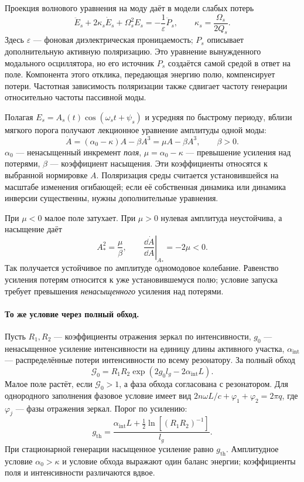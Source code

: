 Проекция волнового уравнения на моду даёт в модели слабых потерь
\begin{equation}
 \ddot E_s+2\kappa_s\dot E_s+\Omega_s^2 E_s
 =-\frac1{\varepsilon}\ddot P_s,\qquad
 \kappa_s=\frac{\Omega_s}{2Q_s}.
\end{equation}
Здесь $\varepsilon$ --- фоновая диэлектрическая проницаемость; $P_s$ описывает дополнительную активную поляризацию. Это уравнение вынужденного модального осциллятора, но его источник $P_s$ создаётся самой средой в ответ на поле. Компонента этого отклика, передающая энергию полю, компенсирует потери. Частотная зависимость поляризации также сдвигает частоту генерации относительно частоты пассивной моды.

Полагая $E_s=A_s(t)\cos(\omega_s t+\psi_s)$ и усредняя по быстрому периоду, вблизи мягкого порога получают лекционное уравнение амплитуды одной моды:
\begin{equation}\label{eq:laserRate}
 \dot A=(\alpha_0-\kappa)A-\beta A^3
       =\mu A-\beta A^3,\qquad \beta>0.
\end{equation}
$\alpha_0$ --- ненасыщенный инкремент \emph{поля}, $\mu=\alpha_0-\kappa$ --- превышение усиления над потерями, $\beta$ --- коэффициент насыщения. Эти коэффициенты относятся к выбранной нормировке $A$. Поляризация среды считается установившейся на масштабе изменения огибающей; если её собственная динамика или динамика инверсии существенны, нужны дополнительные уравнения.

При $\mu<0$ малое поле затухает. При $\mu>0$ нулевая амплитуда неустойчива, а насыщение даёт
\begin{equation}
 A_*^2=\frac{\mu}{\beta},\qquad
 \left.\frac{\dd\dot A}{\dd A}\right|_{A_*}=-2\mu<0.
\end{equation}
Так получается устойчивое по амплитуде одномодовое колебание. Равенство усиления потерям относится к уже установившемуся полю; условие запуска требует превышения \emph{ненасыщенного} усиления над потерями.

\paragraph{То же условие через полный обход.}
Пусть $R_1,R_2$ --- коэффициенты отражения зеркал по интенсивности, $g_0$ --- ненасыщенное усиление интенсивности на единицу длины активного участка, $\alpha_{\mathrm{int}}$ --- распределённые потери интенсивности по всему резонатору. За полный обход
\begin{equation}
 \mathcal G_0=R_1R_2\exp(2g_0l_g-2\alpha_{\mathrm{int}}L).
\end{equation}
Малое поле растёт, если $\mathcal G_0>1$, а фаза обхода согласована с резонатором. Для однородного заполнения фазовое условие имеет вид $2n\omega L/c+\varphi_1+\varphi_2=2\pi q$, где $\varphi_j$ --- фазы отражения зеркал. Порог по усилению:
\begin{equation}\label{eq:laserthreshold}
 g_{\mathrm{th}}=
 \frac{\alpha_{\mathrm{int}}L+\frac12\ln[(R_1R_2)^{-1}]}{l_g}.
\end{equation}
При стационарной генерации насыщенное усиление равно $g_{\mathrm{th}}$. Амплитудное условие $\alpha_0>\kappa$ и условие обхода выражают один баланс энергии; коэффициенты поля и интенсивности различаются вдвое.

